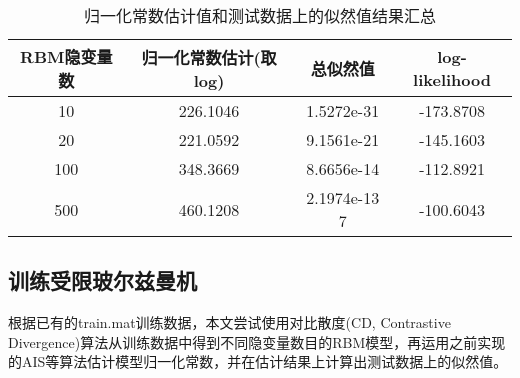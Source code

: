 \documentclass[11pt]{article}
\begin{document}
\begin{table}[!htbp]
  \centering  
  \begin{tabular}{cccc} 
  \hline
  RBM隐变量数 & 归一化常数估计(取log) & 总似然值 & log-likelihood\\ \hline
  10 & 226.1046 & 1.5272e-31 & -173.8708 \\
  20 & 221.0592 & 9.1561e-21 & -145.1603 \\
  100 & 348.3669 & 8.6656e-14 & -112.8921\\
  500 & 460.1208 & 2.1974e-13 7 & -100.6043\\ 
  \hline
\end{tabular}
\caption{归一化常数估计值和测试数据上的似然值结果汇总}
\label{Final_Result}
\end{table}

\subsection{训练受限玻尔兹曼机}
根据已有的train.mat训练数据，本文尝试使用对比散度(CD, Contrastive Divergence)算法从训练数据中得到不同隐变量数目的RBM模型，再运用之前实现的AIS等算法估计模型归一化常数，并在估计结果上计算出测试数据上的似然值。
\end{document}
